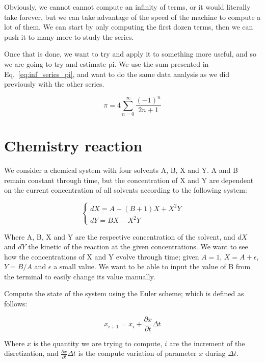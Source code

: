 \documentclass[twocolumn]{article}
\begin{document}
Obviously, we cannot cannot compute an infinity of terms, or it would literally take forever, but we can take advantage of the speed of the machine to compute a lot of them. We can start by only computing the first dozen terms, then we can push it to many more to study the series.

Once that is done, we want to try and apply it to something more useful, and so we are going to try and estimate pi. We use the sum presented in Eq.~\ref{eq:inf_series_pi}, and want to do the same data analysis as we did previously with the other series.

\begin{equation}\label{eq:inf_series_pi}
    \pi = 4\sum_{n=0}^{\infty} \frac{(-1)^n}{2n + 1}
\end{equation}

\section{Chemistry reaction}\label{sec:chemistry}

We consider a chemical system with four solvents A, B, X and Y. A and B remain constant through time, but the concentration of X and Y are dependent on the current concentration of all solvents according to the following system:

\begin{equation}
    \begin{cases}
        dX = A - (B + 1)X + X^2Y\\
        dY = BX - X^2Y
    \end{cases}
\end{equation}

Where A, B, X and Y are the respective concentration of the solvent, and $dX$ and $dY$ the kinetic of the reaction at the given concentrations. We want to see how the concentrations of X and Y evolve through time; given $A = 1$, $X = A + \epsilon$, $Y = B / A$ and $\epsilon$ a small value. We want to be able to input the value of B from the terminal to easily change its value manually.

Compute the state of the system using the Euler scheme; which is defined as follows:

\begin{equation}
    x_{i+1} = x_{i} + \frac{\partial x}{\partial t}\Delta t
\end{equation}

Where $x$ is the quantity we are trying to compute, $i$ are the increment of the disretization, and $\frac{\partial x}{\partial t}\Delta t$ is the compute variation of parameter $x$ during $\Delta t$.
\end{document}
